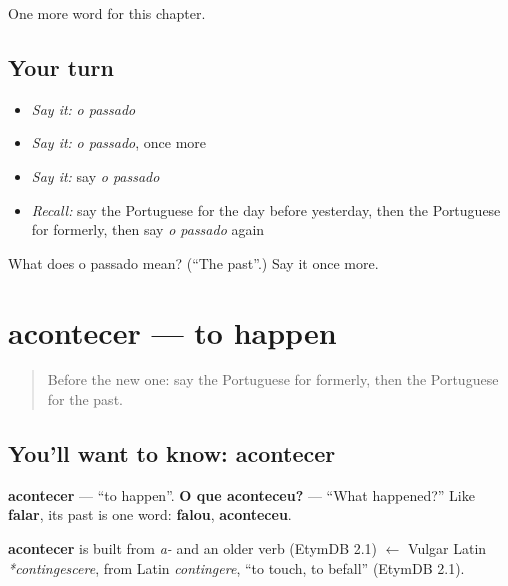 \begin{grammarlens}[title={What you've built}]
One more word for this chapter.
\end{grammarlens}

\subsection*{Your turn}
\begin{itemize}
\raggedright
  \item \emph{Say it:} \emph{o passado}
  \item \emph{Say it:} \emph{o passado}, once more
  \item \emph{Say it:} say \emph{o passado}
  \item \emph{Recall:} say the Portuguese for the day before yesterday, then the Portuguese for formerly, then say \emph{o passado} again
\end{itemize}

\begin{tcolorbox}[breakable,colback=teal!4,colframe=teal!35!black,title={Before you move on}]
What does o passado mean? (\textquotedblleft{}The past\textquotedblright{}.) Say it once more.
\end{tcolorbox}
\section[acontecer]{acontecer — to happen}

\label{lesson:PT-C135-acontecer}



\begin{quote}
Before the new one: say the Portuguese for formerly, then the Portuguese for the past.
\end{quote}

\subsection*{You'll want to know: acontecer}
\textbf{acontecer} — \textquotedblleft{}to happen\textquotedblright{}. \textbf{O que aconteceu?} — \textquotedblleft{}What happened?\textquotedblright{} Like \textbf{falar}, its past is one word: \textbf{falou}, \textbf{aconteceu}.

\begin{cousinweb}
\textbf{acontecer} is built from \emph{a-} and an older verb (EtymDB 2.1) $\leftarrow$ Vulgar Latin \emph{*contingescere}, from Latin \emph{contingere}, \textquotedblleft{}to touch, to befall\textquotedblright{} (EtymDB 2.1).
\end{cousinweb}

